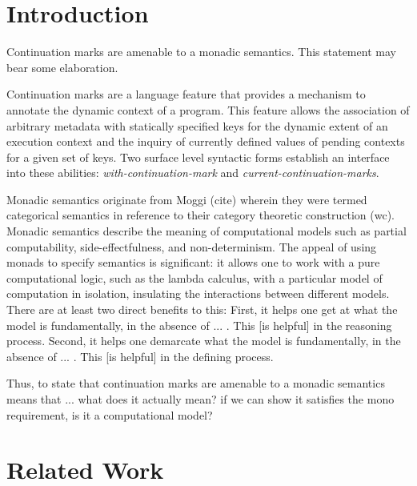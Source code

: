 \documentclass[ms]{byuprop}
\title{\Title}
\author{\Author}
\begin{document}
\maketitle



\section{Introduction}

Continuation marks are amenable to a monadic semantics. This statement may bear some elaboration. 

Continuation marks are a language feature that provides a mechanism to annotate the dynamic context of a program. This feature allows the association of arbitrary metadata with statically specified keys for the dynamic extent of an execution context and the inquiry of currently defined values of pending contexts for a given set of keys. Two surface level syntactic forms establish an interface into these abilities: \emph{with-continuation-mark} and \emph{current-continuation-marks}.

Monadic semantics originate from Moggi (cite) wherein they were termed categorical semantics in reference to their category theoretic construction (wc). Monadic semantics describe the meaning of computational models such as partial computability, side-effectfulness, and non-determinism. The appeal of using monads to specify semantics is significant: it allows one to work with a pure computational logic, such as the lambda calculus, with a particular model of computation in isolation, insulating the interactions between different models. There are at least two direct benefits to this: First, it helps one get at what the model is fundamentally, in the absence of ... . This [is helpful] in the reasoning process. Second, it helps one demarcate what the model is fundamentally, in the absence of ... . This [is helpful] in the defining process.

Thus, to state that continuation marks are amenable to a monadic semantics means that ... what does it actually mean? if we can show it satisfies the mono requirement, is it a computational model?

\section{Related Work}
\end{document}
